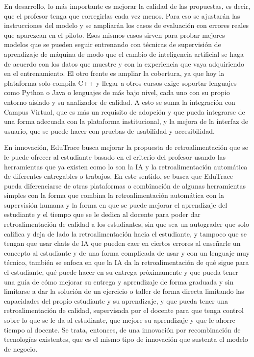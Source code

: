 \documentclass[letterpaper, 10 pt, conference]{ieeeconf}
\begin{document}
En desarrollo, lo más importante es mejorar la calidad de las propuestas, es decir, que el profesor tenga que corregirlas cada vez menos.
Para eso se ajustarán las instrucciones del modelo y se ampliarán los casos de evaluación con errores reales que aparezcan en el piloto.
Esos mismos casos sirven para probar mejores modelos que se pueden seguir entrenando con técnicas de supervisión de aprendizaje de máquina de modo que el cambio
de inteligencia artificial se haga de acuerdo con los datos que muestre y con la experiencia que vaya adquiriendo en el entrenamiento.
El otro frente es ampliar la cobertura, ya que hoy la plataforma solo compila C++ y llegar a otros cursos exige soportar lenguajes como Python o Java o lenguajes de más bajo nivel, cada uno con su propio entorno aislado y su analizador de calidad.
A esto se suma la integración con Campus Virtual, que es más un requisito de adopción y que pueda integrarse de una forma adecuada con la plataforma institucional, y la mejora de la interfaz de usuario, que se puede hacer con pruebas de usabilidad y accesibilidad.

En innovación, EduTrace busca mejorar la propuesta de retroalimentación que se le puede ofrecer al estudiante basado en el criterio del profesor usando las herramientas que ya existen como lo son la IA y la retroalimentación automática de diferentes entregables o trabajos.
En este sentido, se busca que EduTrace pueda diferenciarse de otras plataformas o combinación de algunas herramientas simples con la forma que combina la retroalimentación automática con la supervisión humana y la forma en que se puede mejorar el aprendizaje del estudiante y el tiempo que se le dedica al docente para poder dar retroalimentación de calidad a los estudiantes, 
sin que sea un autograder que solo califica y deja de lado la retroalimentación hacia el estudiante, y tampoco que se tengan que usar chats de IA que pueden caer en ciertos errores al enseñarle un concepto al estudiante y de una forma complicada de usar y con un lenguaje muy técnico, también se enfoca en que la IA da la retroalimentación de qué sigue para el estudiante,
qué puede hacer en su entrega próximamente y que pueda tener una guía de cómo mejorar su entrega y aprendizaje de forma graduada y sin limitarse a dar la solución de un ejercicio o taller de forma directa limitando las capacidades del propio estudiante y su aprendizaje, y que pueda tener una retroalimentación de calidad, supervisada por el docente para que tenga control sobre lo que se le da al estudiante, que mejore su aprendizaje y que le ahorre tiempo al docente.
Se trata, entonces, de una innovación por recombinación de tecnologías existentes, que es el mismo tipo de innovación que sustenta el modelo de negocio.
\end{document}

